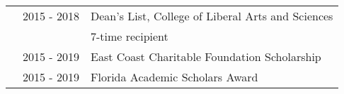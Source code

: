 \documentclass{article}
\begin{document}
\begin{tabular}{p{4cm}p{2.2cm}l}
    & 2015 - 2018 & Dean's List, College of Liberal Arts and Sciences \\
    && \small 7-time recipient \vspace{0.125cm}\\
    
    & 2015 - 2019 & East Coast Charitable Foundation Scholarship \vspace{0.125cm}\\

    & 2015 - 2019 & Florida Academic Scholars Award \vspace{0.125cm}\\

\end{tabular}
\vspace{0.5cm}

\end{document}
